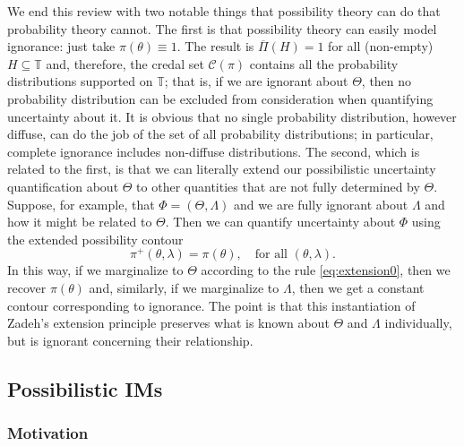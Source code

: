 \documentclass[12pt]{article}
\def\TT{\mathbb{T}}
\def\cred{\mathscr{C}}
\def\uPi{\overline{\Pi}}
\begin{document}
We end this review with two notable things that possibility theory can do that probability theory cannot.  The first is that possibility theory can easily model ignorance: just take $\pi(\theta) \equiv 1$.  The result is $\uPi(H) = 1$ for all (non-empty) $H \subseteq \TT$ and, therefore, the credal set $\cred(\pi)$ contains all the probability distributions supported on $\TT$; that is, if we are ignorant about $\Theta$, then no probability distribution can be excluded from consideration when quantifying uncertainty about it.  It is obvious that no single probability distribution, however diffuse, can do the job of the set of all probability distributions; in particular, complete ignorance includes non-diffuse distributions.  The second, which is related to the first, is that we can literally extend our possibilistic uncertainty quantification about $\Theta$ to other quantities that are not fully determined by $\Theta$.  Suppose, for example, that $\Phi = (\Theta, \Lambda)$ and we are fully ignorant about $\Lambda$ and how it might be related to $\Theta$.  Then we can quantify uncertainty about $\Phi$ using the extended possibility contour 
\[ \pi^+(\theta, \lambda) = \pi(\theta), \quad \text{for all $(\theta,\lambda)$}. \]
In this way, if we marginalize to $\Theta$ according to the rule \eqref{eq:extension0}, then we recover $\pi(\theta)$ and, similarly, if we marginalize to $\Lambda$, then we get a constant contour corresponding to ignorance.  The point is that this instantiation of Zadeh's extension principle preserves what is known about $\Theta$ and $\Lambda$ individually, but is ignorant concerning their relationship.  









\subsection{Possibilistic IMs}
\label{SS:vacuous.im}

\subsubsection{Motivation}
\end{document}
